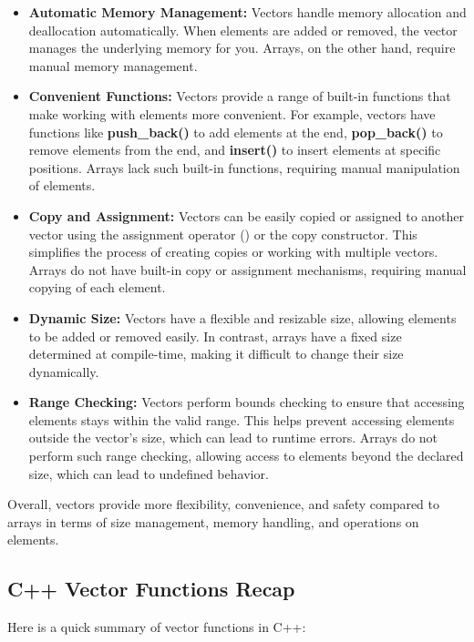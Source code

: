\begin{itemize}
    \item \textbf{Automatic Memory Management:} Vectors handle memory allocation and deallocation automatically. When elements are added or removed, the vector manages the underlying memory for you. 
    Arrays, on the other hand, require manual memory management.
    \item \textbf{Convenient Functions:} Vectors provide a range of built-in functions that make working with elements more convenient. For example, vectors have functions like \textbf{push\_back()} 
    to add elements at the end, \textbf{pop\_back()} to remove elements from the end, and \textbf{insert()} to insert elements at specific positions. Arrays lack such built-in functions, requiring 
    manual manipulation of elements.
    \item \textbf{Copy and Assignment:} Vectors can be easily copied or assigned to another vector using the assignment operator (\function{=}) or the copy constructor. This simplifies the process of creating 
    copies or working with multiple vectors. Arrays do not have built-in copy or assignment mechanisms, requiring manual copying of each element.
    \item \textbf{Dynamic Size:} Vectors have a flexible and resizable size, allowing elements to be added or removed easily. In contrast, arrays have a fixed size determined at compile-time, making 
    it difficult to change their size dynamically.
    \item \textbf{Range Checking:} Vectors perform bounds checking to ensure that accessing elements stays within the valid range. This helps prevent accessing elements outside the vector's size, 
    which can lead to runtime errors. Arrays do not perform such range checking, allowing access to elements beyond the declared size, which can lead to undefined behavior.
\end{itemize}

\noindent Overall, vectors provide more flexibility, convenience, and safety compared to arrays in terms of size management, memory handling, and operations on elements.

\subsection*{C++ Vector Functions Recap}

Here is a quick summary of vector functions in C++:

